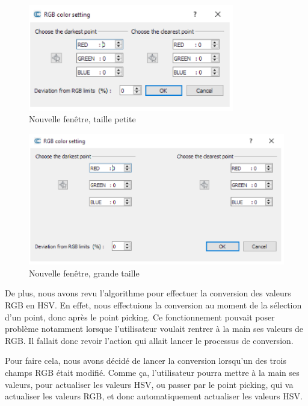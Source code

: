 \documentclass[12pt,titlepage,french]{article}
\begin{document}
\begin{figure}[H]
 \caption{\label{} Nouvelle fenêtre, taille petite}
 \begin{center}
 \includegraphics[width=0.8\textwidth]{./img/rgb_new1.PNG}
  \end{center}
\end{figure}

\begin{figure}[H]
 \caption{\label{} Nouvelle fenêtre, grande taille}
 \begin{center}
 \includegraphics[width=1\textwidth]{./img/rgb_new2.PNG}
  \end{center}
\end{figure}

De plus, nous avons revu l'algorithme pour effectuer la conversion des valeurs RGB en HSV. En effet, nous effectuions la conversion au moment de la sélection d'un point, donc après le point picking. Ce fonctionnement pouvait poser problème notamment lorsque l'utilisateur voulait rentrer à la main ses valeurs de RGB. Il fallait donc revoir l'action qui allait lancer le processus de conversion. \newline

Pour faire cela, nous avons décidé de lancer la conversion lorsqu'un des trois champs RGB était modifié. Comme ça, l'utilisateur pourra mettre à la main ses valeurs, pour actualiser les valeurs HSV, ou passer par le point picking, qui va actualiser les valeurs RGB, et donc automatiquement actualiser les valeurs HSV. \newline
\end{document}
